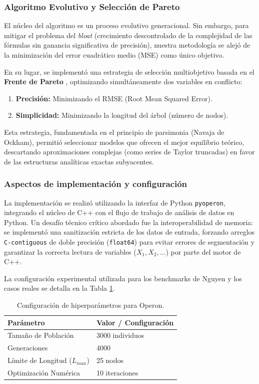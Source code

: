 \subsubsection{Algoritmo Evolutivo y Selección de Pareto}

El núcleo del algoritmo es un proceso evolutivo generacional. Sin embargo, para mitigar el problema del \textit{bloat} (crecimiento descontrolado de la complejidad de las fórmulas sin ganancia significativa de precisión), nuestra metodología se alejó de la minimización del error cuadrático medio (MSE) como único objetivo.

En su lugar, se implementó una estrategia de selección multiobjetivo basada en el \textbf{Frente de Pareto} , optimizando simultáneamente dos variables en conflicto:
\begin{enumerate}
    \item \textbf{Precisión:} Minimizando el RMSE (Root Mean Squared Error).
    \item \textbf{Simplicidad:} Minimizando la longitud del árbol (número de nodos).
\end{enumerate}

Esta estrategia, fundamentada en el principio de parsimonia (Navaja de Ockham), permitió seleccionar modelos que ofrecen el mejor equilibrio teórico, descartando aproximaciones complejas (como series de Taylor truncadas) en favor de las estructuras analíticas exactas subyacentes.

\subsubsection{Aspectos de implementación y configuración}

La implementación se realizó utilizando la interfaz de Python \texttt{pyoperon}, integrando el núcleo de C++ con el flujo de trabajo de análisis de datos en Python. Un desafío técnico crítico abordado fue la interoperabilidad de memoria: se implementó una sanitización estricta de los datos de entrada, forzando arreglos \texttt{C-contiguous} de doble precisión (\texttt{float64}) para evitar errores de segmentación y garantizar la correcta lectura de variables ($X_1, X_2, \dots$) por parte del motor de C++.

La configuración experimental utilizada para los benchmarks de Nguyen y los casos reales se detalla en la Tabla \ref{tab:params_operon}.

\begin{table}[H]
\centering
\caption{Configuración de hiperparámetros para Operon.}
\label{tab:params_operon}
\begin{tabular}{|l|l|}
\hline
\textbf{Parámetro} & \textbf{Valor / Configuración} \\ \hline
Tamaño de Población & 3000 individuos \\ \hline
Generaciones & 4000 \\ \hline
Límite de Longitud ($L_{max}$) & 25 nodos  \\ \hline
Optimización Numérica & 10 iteraciones \\ \hline
\end{tabular}
\end{table}


